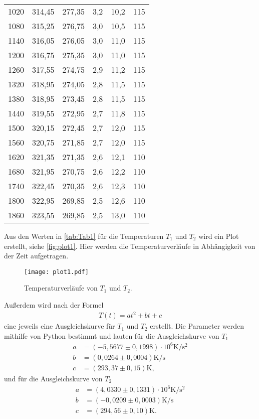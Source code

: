 \begin{table}[H]
\begin{tabular}{S[table-format=4.0] S S S[table-format=1.1] S[table-format=2.1] S[table-format=3.0]}
      1020 & 314,45 & 277,35 & 3,2 & 10,2 & 115\\
      1080 & 315,25 & 276,75 & 3,0 & 10,5 & 115\\
      1140 & 316,05 & 276,05 & 3,0 & 11,0 & 115\\
      1200 & 316,75 & 275,35 & 3,0 & 11,0 & 115\\
      1260 & 317,55 & 274,75 & 2,9 & 11,2 & 115\\
      1320 & 318,95 & 274,05 & 2,8 & 11,5 & 115\\
      1380 & 318,95 & 273,45 & 2,8 & 11,5 & 115\\
      1440 & 319,55 & 272,95 & 2,7 & 11,8 & 115\\
      1500 & 320,15 & 272,45 & 2,7 & 12,0 & 115\\
      1560 & 320,75 & 271,85 & 2,7 & 12,0 & 115\\
      1620 & 321,35 & 271,35 & 2,6 & 12,1 & 110\\
      1680 & 321,95 & 270,75 & 2,6 & 12,2 & 110\\
      1740 & 322,45 & 270,35 & 2,6 & 12,3 & 110\\
      1800 & 322,95 & 269,85 & 2,5 & 12,6 & 110\\
      1860 & 323,55 & 269,85 & 2,5 & 13,0 & 110\\
    \bottomrule
  \end{tabular}
\end{table}

Aus den Werten in \autoref{tab:Tab1} für die Temperaturen $T_1$ und $T_2$ wird ein Plot erstellt, siehe \autoref{fig:plot1}.
Hier werden die Temperaturverläufe in Abhängigkeit von der Zeit aufgetragen.

\begin{figure}
  \centering
  \texttt{[image: plot1.pdf]}
  \caption{Temperaturverläufe von $T_1$ und $T_2$.}
  \label{fig:plot1}
\end{figure}

Außerdem wird nach der Formel
\begin{align*}
  T(t)=at^2+bt+c
\end{align*}
eine jeweils eine Ausgleichskurve für $T_1$ und $T_2$ erstellt.
Die Parameter werden mithilfe von Python bestimmt und lauten für die Ausgleichskurve von $T_1$
\begin{align*}
  a&= (-5,5677 \pm 0,1998) \cdot 10^6 \si{\kelvin\per\second\squared}\\
  b&= (0,0264 \pm 0,0004) \si{\kelvin\per\second}\\
  c&= (293,37 \pm 0,15) \si{\kelvin},
\end{align*}
und für die Ausgleichskurve von $T_2$
\begin{align*}
  a&= (4,0330 \pm 0,1331) \cdot 10^6 \si{\kelvin\per\second\squared}\\
  b&= (-0,0209 \pm 0,0003) \si{\kelvin\per\second}\\
  c&= (294,56 \pm 0,10) \si{\kelvin}.
\end{align*}


